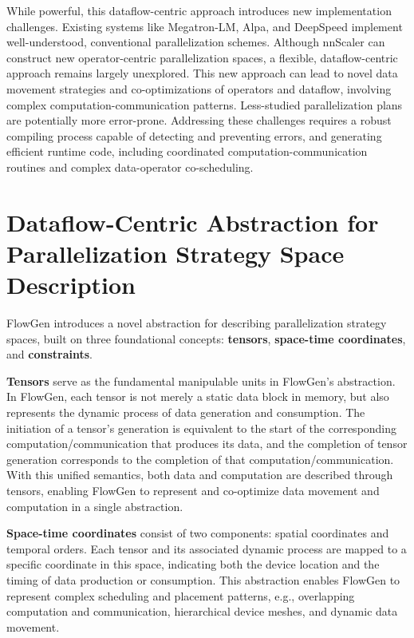 While powerful, this dataflow-centric approach introduces new implementation challenges. Existing systems like Megatron-LM, Alpa, and DeepSpeed implement well-understood, conventional parallelization schemes. Although nnScaler can construct new operator-centric parallelization spaces, a flexible, dataflow-centric approach remains largely unexplored. This new approach can lead to novel data movement strategies and co-optimizations of operators and dataflow, involving complex computation-communication patterns. Less-studied parallelization plans are potentially more error-prone. Addressing these challenges requires a robust compiling process capable of detecting and preventing errors, and generating efficient runtime code, including coordinated computation-communication routines and complex data-operator co-scheduling.


\section{Dataflow-Centric Abstraction for Parallelization Strategy Space Description}

FlowGen introduces a novel abstraction for describing parallelization strategy spaces, built on three foundational concepts: \textbf{tensors}, \textbf{space-time coordinates}, and \textbf{constraints}.

\textbf{Tensors} serve as the fundamental manipulable units in FlowGen's abstraction. In FlowGen, each tensor is not merely a static data block in memory, but also represents the dynamic process of data generation and consumption. The initiation of a tensor's generation is equivalent to the start of the corresponding computation/communication that produces its data, and the completion of tensor generation corresponds to the completion of that computation/communication. With this unified semantics, both data and computation are described through tensors, enabling FlowGen to represent and co-optimize data movement and computation in a single abstraction.

\textbf{Space-time coordinates} consist of two components: spatial coordinates and temporal orders. Each tensor and its associated dynamic process are mapped to a specific coordinate in this space, indicating both the device location and the timing of data production or consumption. This abstraction enables FlowGen to represent complex scheduling and placement patterns, e.g., overlapping computation and communication, hierarchical device meshes, and dynamic data movement.

